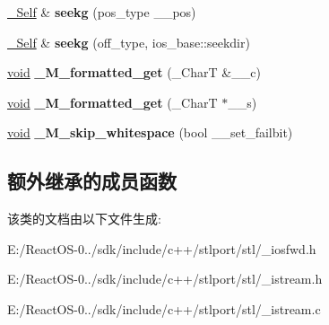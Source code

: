 \begin{DoxyCompactItemize}
\hyperlink{classbasic__istream}{\+\_\+\+Self} \& {\bfseries seekg} (pos\+\_\+type \+\_\+\+\_\+pos)
\item 
\mbox{\label{classbasic__istream_ad66e107b70b205899c0178467396359a}} 
\hyperlink{classbasic__istream}{\+\_\+\+Self} \& {\bfseries seekg} (off\+\_\+type, ios\+\_\+base\+::seekdir)
\item 
\mbox{\label{classbasic__istream_ac53cf820453ecdb8a6494748e0451b75}} 
\hyperlink{interfacevoid}{void} {\bfseries \+\_\+\+M\+\_\+formatted\+\_\+get} (\+\_\+\+CharT \&\+\_\+\+\_\+c)
\item 
\mbox{\label{classbasic__istream_aac7d32c3f51a3618017915e2264580fe}} 
\hyperlink{interfacevoid}{void} {\bfseries \+\_\+\+M\+\_\+formatted\+\_\+get} (\+\_\+\+CharT $\ast$\+\_\+\+\_\+s)
\item 
\mbox{\label{classbasic__istream_adaa02b548c7f807249e3a61e9a02513a}} 
\hyperlink{interfacevoid}{void} {\bfseries \+\_\+\+M\+\_\+skip\+\_\+whitespace} (bool \+\_\+\+\_\+set\+\_\+failbit)
\end{DoxyCompactItemize}
\subsection*{额外继承的成员函数}


该类的文档由以下文件生成\+:\begin{DoxyCompactItemize}
\item 
E\+:/\+React\+O\+S-\/0../sdk/include/c++/stlport/stl/\+\_\+iosfwd.\+h\item 
E\+:/\+React\+O\+S-\/0../sdk/include/c++/stlport/stl/\+\_\+istream.\+h\item 
E\+:/\+React\+O\+S-\/0../sdk/include/c++/stlport/stl/\+\_\+istream.\+c\end{DoxyCompactItemize}
